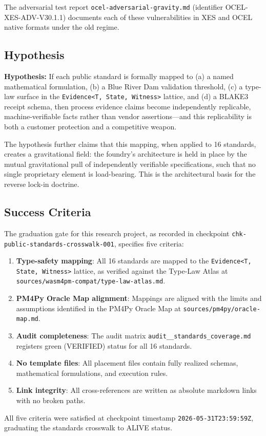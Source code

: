 The adversarial test report \texttt{ocel-adversarial-gravity.md} (identifier
OCEL-XES-ADV-V30.1.1) documents each of these vulnerabilities in XES and OCEL native
formats under the old regime.

\subsection{Hypothesis}
\label{sec:standards-rq-hypothesis}

\textbf{Hypothesis:} If each public standard is formally mapped to (a) a named
mathematical formulation, (b) a Blue River Dam validation threshold, (c) a type-law
surface in the \texttt{Evidence<T, State, Witness>} lattice, and (d) a BLAKE3 receipt
schema, then process evidence claims become independently replicable, machine-verifiable
facts rather than vendor assertions---and this replicability is both a customer protection
and a competitive weapon.

The hypothesis further claims that this mapping, when applied to 16 standards, creates a
gravitational field: the foundry's architecture is held in place by the mutual
gravitational pull of independently verifiable specifications, such that no single
proprietary element is load-bearing. This is the architectural basis for the reverse
lock-in doctrine.

\subsection{Success Criteria}
\label{sec:standards-rq-success}

The graduation gate for this research project, as recorded in checkpoint
\texttt{chk-public-standards-crosswalk-001}, specifies five criteria:

\begin{enumerate}
  \item \textbf{Type-safety mapping}: All 16 standards are mapped to the
        \texttt{Evidence<T, State, Witness>} lattice, as verified against the Type-Law Atlas
        at \texttt{sources/wasm4pm-compat/type-law-atlas.md}.
  \item \textbf{PM4Py Oracle Map alignment}: Mappings are aligned with the limits and
        assumptions identified in the PM4Py Oracle Map at
        \texttt{sources/pm4py/oracle-map.md}.
  \item \textbf{Audit completeness}: The audit matrix \texttt{audit\_\_standards\_coverage.md}
        registers green (VERIFIED) status for all 16 standards.
  \item \textbf{No template files}: All placement files contain fully realized schemas,
        mathematical formulations, and execution rules.
  \item \textbf{Link integrity}: All cross-references are written as absolute markdown
        links with no broken paths.
\end{enumerate}

All five criteria were satisfied at checkpoint timestamp \texttt{2026-05-31T23:59:59Z},
graduating the standards crosswalk to ALIVE status.
